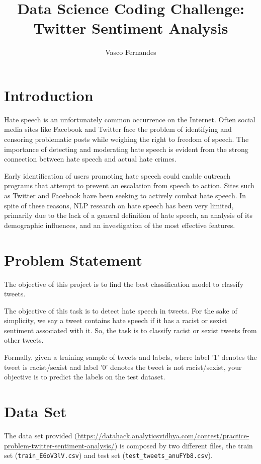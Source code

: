 \documentclass{article}
\begin{document}
	\title{Data Science Coding Challenge: Twitter Sentiment Analysis}
	\author{Vasco Fernandes}
	\maketitle
	\tableofcontents
	\section{Introduction}
		Hate  speech  is  an  unfortunately  common  occurrence  on  the  Internet.  Often social media sites like Facebook and Twitter face the problem of identifying and censoring  problematic  posts  while weighing the right to freedom of speech. The  importance  of  detecting  and  moderating hate  speech  is  evident  from  the  strong  connection between hate speech and actual hate crimes. 
		
		Early identification of users promoting  hate  speech  could  enable  outreach  programs that attempt to prevent an escalation from speech to action. Sites such as Twitter and Facebook have been seeking  to  actively  combat  hate  speech. In spite of these reasons, NLP research on hate speech has been very limited, primarily due to the lack of a general definition of hate speech, an analysis of its demographic influences, and an investigation of the most effective features.
	\section{Problem Statement}
		The objective of this project is to find the best classification model to classify tweets.
		
		The objective of this task is to detect hate speech in tweets. For the sake of simplicity, we say a tweet contains hate speech if it has a racist or sexist sentiment associated with it. So, the task is to classify racist or sexist tweets from other tweets.
		
		Formally, given a training sample of tweets and labels, where label '1' denotes the tweet is racist/sexist and label '0' denotes the tweet is not racist/sexist, your objective is to predict the labels on the test dataset. 
		
	\section{Data Set}
	
		The data set provided (\url{https://datahack.analyticsvidhya.com/contest/practice-problem-twitter-sentiment-analysis/}) is composed by two different files, the train set (\texttt{train\_E6oV3lV.csv}) and test set (\texttt{test\_tweets\_anuFYb8.csv}). 
	
\end{document}
